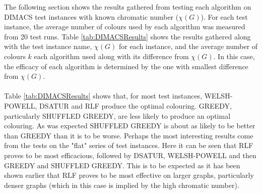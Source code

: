 The following section shows the results gathered from testing each algorithm on DIMACS test instances with known chromatic number ($\chi(G)$). For each test instance, the average number of colours used by each algorithm was measured from 20 test runs. Table \ref{tab:DIMACSResults} shows the results gathered along with the test instance name, $\chi(G)$ for each instance, and the average number of colours $k$ each algorithm used along with its difference from $\chi(G)$. In this case, the efficacy of each algorithm is determined by the one with smallest difference from $\chi(G)$.
\\\\
Table \ref{tab:DIMACSResults} shows that, for most test instances, WELSH-POWELL, DSATUR and RLF produce the optimal colouring. GREEDY, particularly SHUFFLED GREEDY, are less likely to produce an optimal colouring. As was expected SHUFFLED GREEDY is about as likely to be better than GREEDY than it is to be worse. Perhaps the most interesting results come from the tests on the "flat" series of test instances. Here it can be seen that RLF proves to be most efficacious, followed by DSATUR, WELSH-POWELL and then GREEDY and SHUFFLED GREEDY. This is to be expected as it has been shown earlier that RLF proves to be most effective on larger graphs, particularly denser graphs (which in this case is implied by the high chromatic number). 
    
